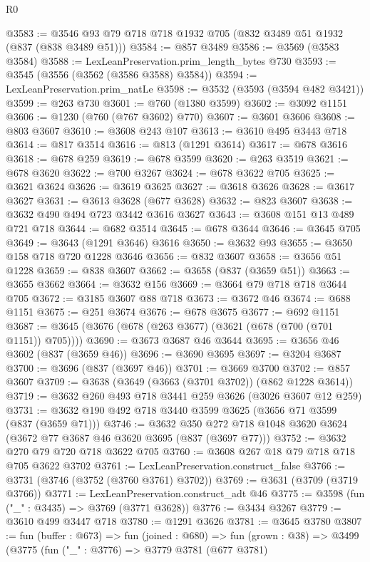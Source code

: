 \begin{lexlean}{R0}
\begin{coremodule}
@3583 := @3546 @93 @79 @718 @718 @1932 @705 (@832 @3489 @51 @1932 (@837 (@838 @3489 @51)))
@3584 := @857 @3489
@3586 := @3569 (@3583 @3584)
@3588 := LexLeanPreservation.prim_length_bytes @730
@3593 := @3545 (@3556 (@3562 (@3586 @3588) @3584))
@3594 := LexLeanPreservation.prim_natLe
@3598 := @3532 (@3593 (@3594 @482 @3421))
@3599 := @263 @730
@3601 := @760 (@1380 @3599)
@3602 := @3092 @1151
@3606 := @1230 (@760 (@767 @3602) @770)
@3607 := @3601 @3606
@3608 := @803 @3607
@3610 := @3608 @243 @107
@3613 := @3610 @495 @3443 @718
@3614 := @817 @3514
@3616 := @813 (@1291 @3614)
@3617 := @678 @3616
@3618 := @678 @259
@3619 := @678 @3599
@3620 := @263 @3519
@3621 := @678 @3620
@3622 := @700 @3267
@3624 := @678 @3622 @705
@3625 := @3621 @3624
@3626 := @3619 @3625
@3627 := @3618 @3626
@3628 := @3617 @3627
@3631 := @3613 @3628 (@677 @3628)
@3632 := @823 @3607
@3638 := @3632 @490 @494 @723 @3442 @3616 @3627
@3643 := @3608 @151 @13 @489 @721 @718
@3644 := @682 @3514
@3645 := @678 @3644
@3646 := @3645 @705
@3649 := @3643 (@1291 @3646) @3616
@3650 := @3632 @93
@3655 := @3650 @158 @718 @720 @1228 @3646
@3656 := @832 @3607
@3658 := @3656 @51 @1228
@3659 := @838 @3607
@3662 := @3658 (@837 (@3659 @51))
@3663 := @3655 @3662
@3664 := @3632 @156
@3669 := @3664 @79 @718 @718 @3644 @705
@3672 := @3185 @3607 @88 @718
@3673 := @3672 @46
@3674 := @688 @1151
@3675 := @251 @3674
@3676 := @678 @3675
@3677 := @692 @1151
@3687 := @3645 (@3676 (@678 (@263 @3677) (@3621 (@678 (@700 (@701 @1151)) @705))))
@3690 := @3673 @3687 @46 @3644
@3695 := @3656 @46 @3602 (@837 (@3659 @46))
@3696 := @3690 @3695
@3697 := @3204 @3687
@3700 := @3696 (@837 (@3697 @46))
@3701 := @3669 @3700
@3702 := @857 @3607
@3709 := @3638 (@3649 (@3663 (@3701 @3702)) (@862 @1228 @3614))
@3719 := @3632 @260 @493 @718 @3441 @259 @3626 (@3026 @3607 @12 @259)
@3731 := @3632 @190 @492 @718 @3440 @3599 @3625 (@3656 @71 @3599 (@837 (@3659 @71)))
@3746 := @3632 @350 @272 @718 @1048 @3620 @3624 (@3672 @77 @3687 @46 @3620 @3695 (@837 (@3697 @77)))
@3752 := @3632 @270 @79 @720 @718 @3622 @705
@3760 := @3608 @267 @18 @79 @718 @718 @705 @3622 @3702
@3761 := LexLeanPreservation.construct_false
@3766 := @3731 (@3746 (@3752 (@3760 @3761) @3702))
@3769 := @3631 (@3709 (@3719 @3766))
@3771 := LexLeanPreservation.construct_adt @46
@3775 := @3598 (fun ("_" : @3435) => @3769 (@3771 @3628))
@3776 := @3434 @3267
@3779 := @3610 @499 @3447 @718
@3780 := @1291 @3626
@3781 := @3645 @3780
@3807 := fun (buffer : @673) =>
  fun (joined : @680) =>
  fun (grown : @38) =>
  @3499
    (@3775
      (fun ("_" : @3776) =>
      @3779
        @3781
        (@677 @3781)

\end{coremodule}
\end{lexlean}
